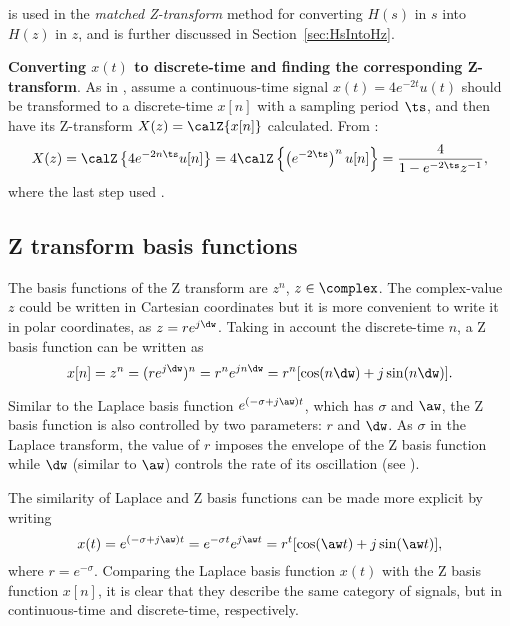  is used in the \emph{matched Z-transform} method for converting $H(s)$ in $s$ into $H(z)$ in $z$, and is further discussed in
Section~\ref{sec:HsIntoHz}.

\bExample \textbf{Converting $x(t)$ to discrete-time and finding the corresponding Z-transform}.
\label{ex:exampleZ} 
As in , assume a continuous-time signal $x(t) = 4 e^{-2t} u(t)$ should be transformed to a discrete-time $x[n]$ with a sampling period $\ts$, and then have its Z-transform
$X(z) = \calZ \{x[n] \}$ calculated. From :
\begin{equation}
X(z) = \calZ \left\{ 4 e^{-2 n \ts} u[n] \right\} = 4 \calZ \left\{ \left(e^{-2 \ts}\right)^n u[n] \right\} = \frac{4}{1 - e^{-2 \ts}z^{ -1 }},
\label{eq:exampleZ}
\end{equation}
where the last step used .
\eExample

\subsection{{\akadvanced} Z transform basis functions}

The basis functions of the Z transform are $z^n$, $z \in \complex$. 
The complex-value $z$ could be written in Cartesian coordinates but it is more convenient
to write it in polar coordinates, as $z= r e^{j \dw}$.
Taking in account the discrete-time $n$, a Z basis function can be written as
\[
x[n] = z^n = (r e^{j \dw})^n = r^n e^{j n \dw} = r^n [ \cos(n \dw) + j \sin(n \dw) ].
\]

Similar to the Laplace basis function $e^{(-\sigma + j \aw)t}$, which has $\sigma$ and $\aw$,
the Z basis function is also controlled by two parameters: $r$ and $\dw$. As $\sigma$ in the Laplace transform,
the value of $r$ imposes the envelope of the Z basis function while $\dw$ (similar to $\aw$) controls the
rate of its oscillation (see ).

The similarity of Laplace and Z basis functions can be made more explicit by
writing 
\[
x(t) = e^{(-\sigma + j \aw)t} = e^{-\sigma t} e^{j \aw t} = r^t [ \cos(\aw t) + j \sin(\aw t) ],
\]
where $r = e^{-\sigma}$.
Comparing the Laplace basis function $x(t)$ with the Z basis function $x[n]$, it is clear that
they describe the same category of signals, but in continuous-time and discrete-time, respectively.

